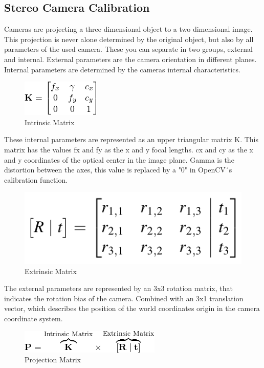 \documentclass[journal,onecolumn]{IEEEtran}
\begin{document}
\subsection{Stereo Camera Calibration}
\noindent
Cameras are projecting a three dimensional object to a two dimensional image. This projection is never alone determined by the original object, but also by all parameters of the used camera. These you can separate in two groups, external and internal. External parameters are the camera orientation in different planes. Internal parameters are determined by the cameras internal characteristics.
\begin{figure}[H]
	\centering
	\includegraphics[scale=0.8]{intrinsicMatrix.png}
	\captionsetup{justification=centering}
	\caption{Intrinsic Matrix}
\end{figure}
\noindent
These internal parameters are represented as an upper triangular matrix K. This matrix has the values fx and fy as the x and y focal lengths. cx and cy as the x and y coordinates of the optical center in the image plane. Gamma is the distortion between the axes, this value is replaced by a "0" in OpenCV´s calibration function.\newline
\begin{figure}[H]
	\centering
	\includegraphics[scale=0.4]{extrinsicMatrix.png}
	\captionsetup{justification=centering}
	\caption{Extrinsic Matrix}
\end{figure}
\noindent
The external parameters are represented by an 3x3 rotation matrix, that indicates the rotation bias of the camera. Combined with an 3x1 translation vector, which describes the position of the world coordinates origin in the camera coordinate system.\newline
\begin{figure}[H]
	\centering
	\includegraphics[scale=0.7]{projectionMatrix.png}
	\captionsetup{justification=centering}
	\caption{Projection Matrix}
\end{figure}
\end{document}
